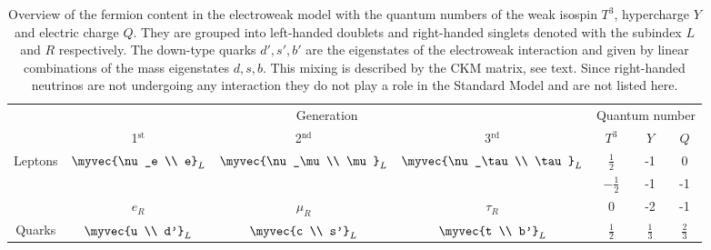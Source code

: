   \begin{table}
    \caption[Overview of the fermion content in the electroweak model.]{Overview of the fermion content in the electroweak model with the quantum numbers of the weak isospin $T^3$, hypercharge $Y$ and electric charge $Q$. They are grouped into left-handed doublets and right-handed singlets denoted with the subindex $L$ and $R$ respectively. The down-type quarks $d', s', b'$ are the eigenstates of the electroweak interaction and given by linear combinations of the mass eigenstates $d, s, b$. This mixing is described by the CKM matrix, see text. Since right-handed neutrinos are not undergoing any interaction they do not play a role in the Standard Model and are not listed here.}
    \label{tab:ewfermioncontent}
    \centering
      \begin{tabular}{c |@{}| c c c | c c c}
        \toprule
                                 & \multicolumn{3}{c}{Generation}          & \multicolumn{3}{|c}{Quantum number}                                                                                                            \\
                                 & 1$^{\text{st}}$                         & 2$^{\text{nd}}$                             & 3$^{\text{rd}}$                               & $T^3$          & $Y$            & $Q$            \\
        \midrule
        \multirow{3}{*}{Leptons} & \multirow{2}{*}{$\myvec{\nu_e                                                                                                                                                            \\ e}_L$} & \multirow{2}{*}{$\myvec{\nu_\mu \\ \mu}_L$} & \multirow{2}{*}{$\myvec{\nu_\tau \\ \tau}_L$} & $\frac{1}{2}$  & -1             & 0 \\
                                 &                                         &                                             &                                               & $-\frac{1}{2}$ & -1             & -1             \\
                                 & $e_R$                                   & $\mu_R$                                     & $\tau_R$                                      & 0              & -2             & -1             \\
        \midrule
        \multirow{3}{*}{Quarks}  & \multirow{2}{*}{$\myvec{u                                                                                                                                                                \\ d'}_L$}    & \multirow{2}{*}{$\myvec{c \\ s'}_L$}        & \multirow{2}{*}{$\myvec{t \\ b'}_L$}          & $\frac{1}{2}$  & $\frac{1}{3}$  & $\frac{2}{3}$ \\

\end{tabular}
\end{table}
